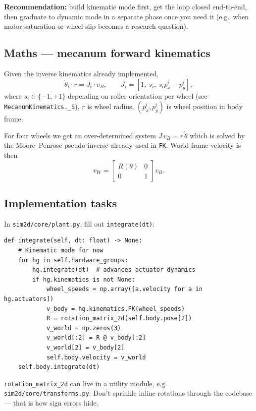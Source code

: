 \documentclass[11pt,a4paper]{article}
\newcommand{\code}[1]{\texttt{\small #1}}
\newcommand{\file}[1]{\texttt{\small #1}}
\newcommand{\Rmat}[1]{R(#1)}
\begin{document}
\textbf{Recommendation:} build kinematic mode first, get the loop closed
end-to-end, then graduate to dynamic mode in a separate phase once you
need it (e.g.\ when motor saturation or wheel slip becomes a research
question).

\subsection*{Maths --- mecanum forward kinematics}

Given the inverse kinematics already implemented,
\begin{equation}
    \dot\theta_i \cdot r = J_i \cdot v_B,\qquad
    J_i = [1,\ s_i,\ s_i p_x^i - p_y^i],
\end{equation}
where $s_i \in \{-1, +1\}$ depending on roller orientation per wheel
(see \code{MecanumKinematics.\_S}), $r$ is wheel radius, $(p_x^i, p_y^i)$
is wheel position in body frame.

For four wheels we get an over-determined system $J\, v_B = r\, \dot\theta$
which is solved by the Moore--Penrose pseudo-inverse already used in
\code{FK}. World-frame velocity is then
\begin{equation}
    v_W = \begin{bmatrix} \Rmat{\theta} & 0 \\ 0 & 1 \end{bmatrix} v_B.
    \label{eq:body2world}
\end{equation}

\subsection*{Implementation tasks}

In \file{sim2d/core/plant.py}, fill out \code{integrate(dt)}:

\begin{lstlisting}
def integrate(self, dt: float) -> None:
    # Kinematic mode for now
    for hg in self.hardware_groups:
        hg.integrate(dt)  # advances actuator dynamics
        if hg.kinematics is not None:
            wheel_speeds = np.array([a.velocity for a in hg.actuators])
            v_body = hg.kinematics.FK(wheel_speeds)
            R = rotation_matrix_2d(self.body.pose[2])
            v_world = np.zeros(3)
            v_world[:2] = R @ v_body[:2]
            v_world[2] = v_body[2]
            self.body.velocity = v_world
    self.body.integrate(dt)
\end{lstlisting}

\code{rotation\_matrix\_2d} can live in a utility module, e.g.
\file{sim2d/core/transforms.py}. Don't sprinkle inline rotations through
the codebase --- that is how sign errors hide.
\end{document}
